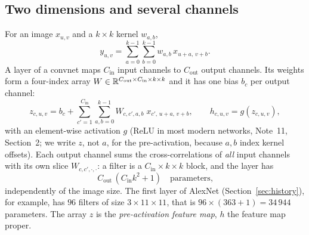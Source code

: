 \documentclass[11pt]{article}
\newcommand{\Cin}{C_{\mathrm{in}}}
\newcommand{\Cout}{C_{\mathrm{out}}}
\begin{document}
\subsection{Two dimensions and several channels}

For an image $x_{u,v}$ and a $k \times k$ kernel $w_{a,b}$,
\begin{equation}\label{eq:xcorr2}
  y_{u,v} = \sum_{a=0}^{k-1}\sum_{b=0}^{k-1} w_{a,b}\, x_{u+a,\,v+b} .
\end{equation}
A layer of a convnet maps $\Cin$ input channels to $\Cout$ output channels. Its weights form a four-index array
$W \in \R^{\Cout \times \Cin \times k \times k}$ and it has one bias $b_c$ per output channel:
\begin{equation}\label{eq:convlayer}
  z_{c,u,v} = b_c + \sum_{c'=1}^{\Cin} \sum_{a,b=0}^{k-1} W_{c,c',a,b}\; x_{c',\,u+a,\,v+b}, \qquad
  h_{c,u,v} = g(z_{c,u,v}) ,
\end{equation}
with an element-wise activation $g$ (ReLU in most modern networks, Note~11, Section~2; we write $z$, not $a$, for the
pre-activation, because $a, b$ index kernel offsets). Each output channel sums the
cross-correlations of \emph{all} input channels with its own slice $W_{c,c',\cdot,\cdot}$: a filter is a $\Cin \times k
\times k$ block, and the layer has
\begin{equation}\label{eq:params}
  \Cout\,(\Cin k^2 + 1) \quad \text{parameters,}
\end{equation}
independently of the image size. The first layer of AlexNet (Section~\ref{sec:history}), for example, has $96$ filters of
size $3 \times 11 \times 11$, that is $96 \times (363 + 1) = 34\,944$ parameters. The array $z$ is the
\emph{pre-activation feature map}, $h$ the feature map proper.
\end{document}
